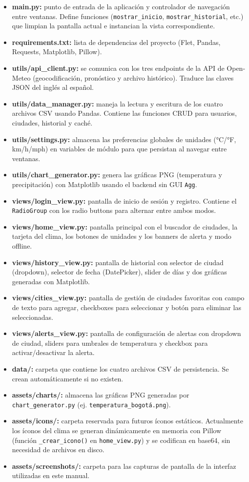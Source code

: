 \documentclass[12pt,a4paper]{article}
\begin{document}
\begin{itemize}[itemsep=3pt]
    \item \textbf{main.py:} punto de entrada de la aplicación y controlador de navegación entre ventanas. Define funciones (\texttt{mostrar\_inicio}, \texttt{mostrar\_historial}, etc.) que limpian la pantalla actual e instancian la vista correspondiente.
    \item \textbf{requirements.txt:} lista de dependencias del proyecto (Flet, Pandas, Requests, Matplotlib, Pillow).
    \item \textbf{utils/api\_client.py:} se comunica con los tres endpoints de la API de Open-Meteo (geocodificación, pronóstico y archivo histórico). Traduce las claves JSON del inglés al español.
    \item \textbf{utils/data\_manager.py:} maneja la lectura y escritura de los cuatro archivos CSV usando Pandas. Contiene las funciones CRUD para usuarios, ciudades, historial y caché.
    \item \textbf{utils/settings.py:} almacena las preferencias globales de unidades (°C/°F, km/h/mph) en variables de módulo para que persistan al navegar entre ventanas.
    \item \textbf{utils/chart\_generator.py:} genera las gráficas PNG (temperatura y precipitación) con Matplotlib usando el backend sin GUI \texttt{Agg}.
    \item \textbf{views/login\_view.py:} pantalla de inicio de sesión y registro. Contiene el \texttt{RadioGroup} con los radio buttons para alternar entre ambos modos.
    \item \textbf{views/home\_view.py:} pantalla principal con el buscador de ciudades, la tarjeta del clima, los botones de unidades y los banners de alerta y modo offline.
    \item \textbf{views/history\_view.py:} pantalla de historial con selector de ciudad (dropdown), selector de fecha (DatePicker), slider de días y dos gráficas generadas con Matplotlib.
    \item \textbf{views/cities\_view.py:} pantalla de gestión de ciudades favoritas con campo de texto para agregar, checkboxes para seleccionar y botón para eliminar las seleccionadas.
    \item \textbf{views/alerts\_view.py:} pantalla de configuración de alertas con dropdown de ciudad, sliders para umbrales de temperatura y checkbox para activar/desactivar la alerta.
    \item \textbf{data/:} carpeta que contiene los cuatro archivos CSV de persistencia. Se crean automáticamente si no existen.
    \item \textbf{assets/charts/:} almacena las gráficas PNG generadas por \texttt{chart\_generator.py} (ej. \texttt{temperatura\_bogotá.png}).
    \item \textbf{assets/icons/:} carpeta reservada para futuros íconos estáticos. Actualmente los íconos del clima se generan dinámicamente en memoria con Pillow (función \texttt{\_crear\_icono()} en \texttt{home\_view.py}) y se codifican en base64, sin necesidad de archivos en disco.
    \item \textbf{assets/screenshots/:} carpeta para las capturas de pantalla de la interfaz utilizadas en este manual.
\end{itemize}
\end{document}
